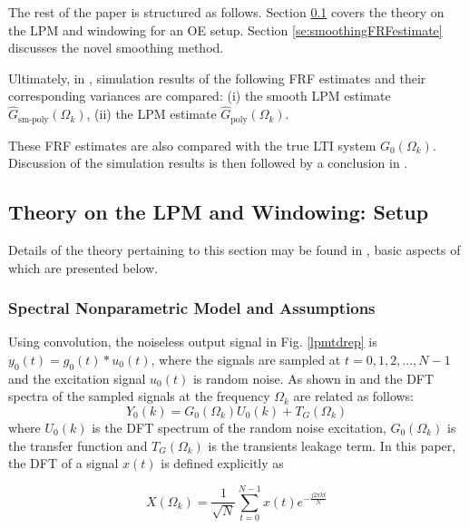 The rest of the paper is structured as follows. Section \ref{se:theoryLPMandWindowing} covers the theory on the LPM and windowing for an OE setup. 
Section \ref{se:smoothingFRFestimate} discusses the novel smoothing method. 



Ultimately, in , simulation results of the following FRF estimates and their corresponding variances are compared: (i) the smooth LPM estimate $\hat{G}_\text{sm-poly}(\Omega_k)$, (ii) the LPM estimate $\hat{G}_\text{poly}(\Omega_k)$. 

These FRF estimates are also compared with the true \gls{LTI} system ${G}_0(\Omega_k)$. 
Discussion of the simulation results is then followed by a conclusion in .

\subsection{Theory on the LPM and Windowing:  Setup}
\label{se:theoryLPMandWindowing}

Details of the theory pertaining to this section may be found in \citep{schoukens2010nonparametric}, basic aspects of which are presented below.


\subsubsection{Spectral Nonparametric Model and Assumptions}

Using convolution, the noiseless output signal in Fig. \ref{lpmtdrep} is $y_0(t) = g_0(t)*u_0(t)$, where the signals are sampled at $t = 0, 1, 2,...,N-1$ and the excitation signal $u_0(t)$ is random noise. As shown in \citep{Pintelon2012} and \citep{Pintelon1997} the \gls{DFT} spectra of the sampled signals at the frequency $\Omega_k$ are related as follows:
\begin{equation}\label{lpmleak}
Y_0(k)=G_0(\Omega_k)U_0(k)+T_G(\Omega_k)
\end{equation}
where $U_0(k)$ is the \gls{DFT} spectrum of the random noise excitation,  $G_0(\Omega_k)$ is the transfer function and $T_G(\Omega_k)$ is the transients leakage term. 
In this paper, the \gls{DFT} of a signal $x(t)$ is defined explicitly as  \citep{Oppenheim1983}

\begin{equation}\label{eq:defDFT}
X(\Omega_k) = \frac{1}{\sqrt{N}}\sum_{t=0}^{N-1}x(t)e^{-\frac{j2\pi kt}{N}}
\end{equation}


